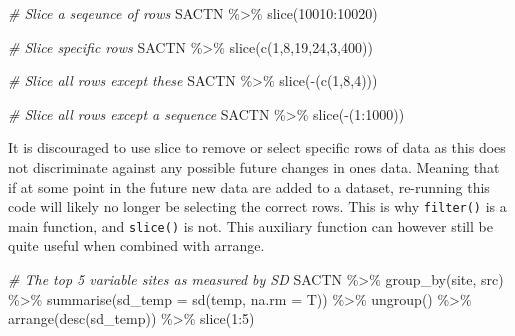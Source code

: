 \documentclass[
]{book}
\newenvironment{Shaded}{\begin{snugshade}}{\end{snugshade}}
\newcommand{\AttributeTok}[1]{\textcolor[rgb]{0.77,0.63,0.00}{#1}}
\newcommand{\CommentTok}[1]{\textcolor[rgb]{0.56,0.35,0.01}{\textit{#1}}}
\newcommand{\DecValTok}[1]{\textcolor[rgb]{0.00,0.00,0.81}{#1}}
\newcommand{\FunctionTok}[1]{\textcolor[rgb]{0.00,0.00,0.00}{#1}}
\newcommand{\NormalTok}[1]{#1}
\newcommand{\SpecialCharTok}[1]{\textcolor[rgb]{0.00,0.00,0.00}{#1}}
\begin{document}
\begin{Shaded}
\begin{Highlighting}[]
\CommentTok{\# Slice a seqeunce of rows}
\NormalTok{SACTN }\SpecialCharTok{\%\textgreater{}\%} 
  \FunctionTok{slice}\NormalTok{(}\DecValTok{10010}\SpecialCharTok{:}\DecValTok{10020}\NormalTok{)}

\CommentTok{\# Slice specific rows}
\NormalTok{SACTN }\SpecialCharTok{\%\textgreater{}\%}
  \FunctionTok{slice}\NormalTok{(}\FunctionTok{c}\NormalTok{(}\DecValTok{1}\NormalTok{,}\DecValTok{8}\NormalTok{,}\DecValTok{19}\NormalTok{,}\DecValTok{24}\NormalTok{,}\DecValTok{3}\NormalTok{,}\DecValTok{400}\NormalTok{))}

\CommentTok{\# Slice all rows except these}
\NormalTok{SACTN }\SpecialCharTok{\%\textgreater{}\%} 
  \FunctionTok{slice}\NormalTok{(}\SpecialCharTok{{-}}\NormalTok{(}\FunctionTok{c}\NormalTok{(}\DecValTok{1}\NormalTok{,}\DecValTok{8}\NormalTok{,}\DecValTok{4}\NormalTok{)))}

\CommentTok{\# Slice all rows except a sequence}
\NormalTok{SACTN }\SpecialCharTok{\%\textgreater{}\%} 
  \FunctionTok{slice}\NormalTok{(}\SpecialCharTok{{-}}\NormalTok{(}\DecValTok{1}\SpecialCharTok{:}\DecValTok{1000}\NormalTok{))}
\end{Highlighting}
\end{Shaded}

It is discouraged to use slice to remove or select specific rows of data as this does not discriminate against any possible future changes in ones data. Meaning that if at some point in the future new data are added to a dataset, re-running this code will likely no longer be selecting the correct rows. This is why \texttt{filter()} is a main function, and \texttt{slice()} is not. This auxiliary function can however still be quite useful when combined with arrange.

\begin{Shaded}
\begin{Highlighting}[]
\CommentTok{\# The top 5 variable sites as measured by SD}
\NormalTok{SACTN }\SpecialCharTok{\%\textgreater{}\%} 
  \FunctionTok{group\_by}\NormalTok{(site, src) }\SpecialCharTok{\%\textgreater{}\%} 
  \FunctionTok{summarise}\NormalTok{(}\AttributeTok{sd\_temp =} \FunctionTok{sd}\NormalTok{(temp, }\AttributeTok{na.rm =}\NormalTok{ T)) }\SpecialCharTok{\%\textgreater{}\%} 
  \FunctionTok{ungroup}\NormalTok{() }\SpecialCharTok{\%\textgreater{}\%} 
  \FunctionTok{arrange}\NormalTok{(}\FunctionTok{desc}\NormalTok{(sd\_temp)) }\SpecialCharTok{\%\textgreater{}\%} 
  \FunctionTok{slice}\NormalTok{(}\DecValTok{1}\SpecialCharTok{:}\DecValTok{5}\NormalTok{)}
\end{Highlighting}
\end{Shaded}
\end{document}
